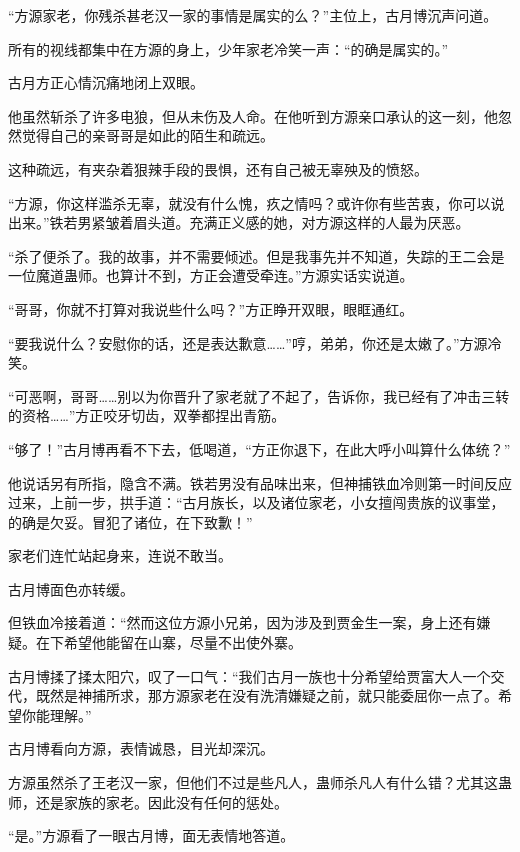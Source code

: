 
\begin{this_body}

“方源家老，你残杀甚老汉一家的事情是属实的么？”主位上，古月博沉声问道。

所有的视线都集中在方源的身上，少年家老冷笑一声：“的确是属实的。”

古月方正心情沉痛地闭上双眼。

他虽然斩杀了许多电狼，但从未伤及人命。在他听到方源亲口承认的这一刻，他忽然觉得自己的亲哥哥是如此的陌生和疏远。

这种疏远，有夹杂着狠辣手段的畏惧，还有自己被无辜殃及的愤怒。

“方源，你这样滥杀无辜，就没有什么愧，疚之情吗？或许你有些苦衷，你可以说出来。”铁若男紧皱着眉头道。充满正义感的她，对方源这样的人最为厌恶。

“杀了便杀了。我的故事，并不需要倾述。但是我事先并不知道，失踪的王二会是一位魔道蛊师。也算计不到，方正会遭受牵连。”方源实话实说道。

“哥哥，你就不打算对我说些什么吗？”方正睁开双眼，眼眶通红。

“要我说什么？安慰你的话，还是表达歉意……”哼，弟弟，你还是太嫩了。”方源冷笑。

“可恶啊，哥哥……别以为你晋升了家老就了不起了，告诉你，我已经有了冲击三转的资格……”方正咬牙切齿，双拳都捏出青筋。

“够了！”古月博再看不下去，低喝道，“方正你退下，在此大呼小叫算什么体统？”

他说话另有所指，隐含不满。铁若男没有品味出来，但神捕铁血冷则第一时间反应过来，上前一步，拱手道：“古月族长，以及诸位家老，小女擅闯贵族的议事堂，的确是欠妥。冒犯了诸位，在下致歉！”

家老们连忙站起身来，连说不敢当。

古月博面色亦转缓。

但铁血冷接着道：“然而这位方源小兄弟，因为涉及到贾金生一案，身上还有嫌疑。在下希望他能留在山寨，尽量不出使外寨。

古月博揉了揉太阳穴，叹了一口气：“我们古月一族也十分希望给贾富大人一个交代，既然是神捕所求，那方源家老在没有洗清嫌疑之前，就只能委屈你一点了。希望你能理解。”

古月博看向方源，表情诚恳，目光却深沉。

方源虽然杀了王老汉一家，但他们不过是些凡人，蛊师杀凡人有什么错？尤其这蛊师，还是家族的家老。因此没有任何的惩处。

“是。”方源看了一眼古月博，面无表情地答道。


\end{this_body}
